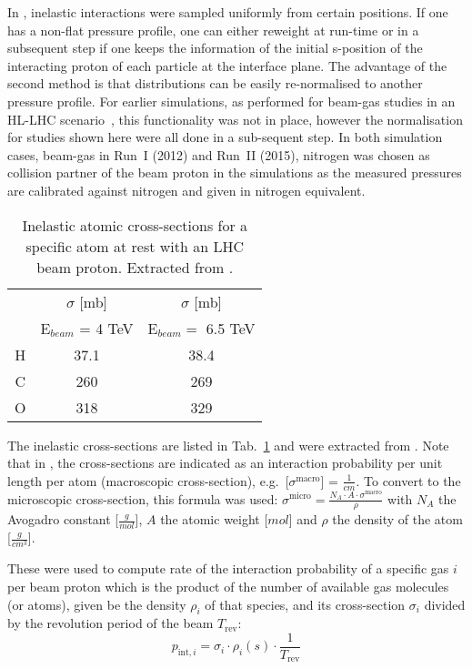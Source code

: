 In \fluka, inelastic interactions were sampled uniformly from certain positions. If one has a non-flat pressure profile, one can either reweight at run-time or in a subsequent step if one keeps the information of the initial s-position of the interacting proton of each particle at the interface plane. The advantage of the second method is that distributions can be easily re-normalised to another pressure profile. For earlier simulations, as performed for beam-gas studies in an HL-LHC scenario~\cite{kwee14ipac}, this functionality was not in place, however the normalisation for studies shown here were all done in a sub-sequent step. In both simulation cases, beam-gas in Run~I (2012) and Run~II (2015), nitrogen was chosen as collision partner of the beam proton in the simulations as the measured pressures are calibrated against nitrogen and given in nitrogen equivalent.

\begin{table}
   \centering
   \caption{Inelastic atomic cross-sections for a specific atom at rest with an LHC beam proton. Extracted from \fluka.}
   \begin{tabular}{c|c|c}\hline
     &  $\sigma$ [mb] &  $\sigma$ [mb] \\
       & E$_{beam}$ = 4 TeV   & E$_{beam} =$ 6.5 TeV \\ \hline\hline
       H & 37.1 & 38.4 \\
       C & 260& 269 \\
       O & 318 & 329 \\
       \hline
   \end{tabular}
   \label{tab:atomicXsections}
\end{table}

The inelastic cross-sections are listed in Tab.~\ref{tab:atomicXsections} and were extracted from \fluka. Note that in \fluka, the cross-sections are indicated as an interaction probability per unit length per atom (macroscopic cross-section), e.g.~[$\sigma^{\textrm{macro}}$] = $\frac{1}{cm}$. To convert to the microscopic cross-section, this formula was used: $\sigma^{\textrm{micro}} = \frac{N_A \cdot A \cdot \sigma^{\textrm{macro}}}{\rho}$ with $N_A$ the Avogadro constant [$\frac{g}{mol}$], $A$ the atomic weight [$mol$] and $\rho$ the density of the atom [$\frac{g}{cm^3}$].

These were used to compute rate of the interaction probability of a specific gas $i$ per beam proton which is the product of the number of available gas molecules (or atoms), given be the density $\rho_i$ of that species, and its cross-section $\sigma_i$ divided by the revolution period of the beam $T_{\mathrm{rev}}$:
\begin{equation} \label{eq2}
p_{\mathrm{int},i} = \sigma_{i} \cdot \rho_{i}(s) \cdot \frac{1}{T_{\mathrm{rev}}}
\end{equation}

